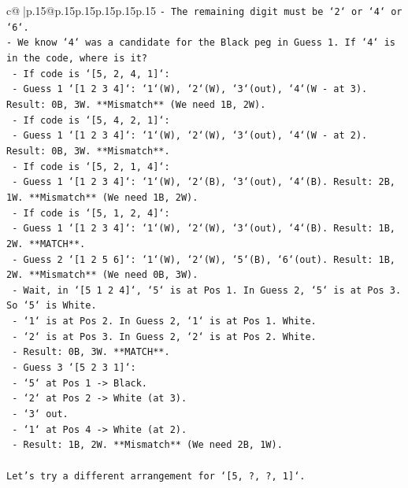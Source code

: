 \documentclass{article}
\begin{document}
{\begin{supertabular}{c@{$\;$}|p{.15\linewidth}@{}p{.15\linewidth}p{.15\linewidth}p{.15\linewidth}p{.15\linewidth}p{.15\linewidth}}
{{{\texttt{{-} The remaining digit must be `2` or `4` or `6`.} \\
\texttt{{-} We know `4` was a candidate for the Black peg in Guess 1. If `4` is in the code, where is it?} \\
\texttt{    {-} If code is `{[}5, 2, 4, 1{]}`:} \\
\texttt{        {-} Guess 1 `{[}1 2 3 4{]}`: `1`(W), `2`(W), `3`(out), `4`(W {-} at 3). Result: 0B, 3W. **Mismatch** (We need 1B, 2W).} \\
\texttt{    {-} If code is `{[}5, 4, 2, 1{]}`:} \\
\texttt{        {-} Guess 1 `{[}1 2 3 4{]}`: `1`(W), `2`(W), `3`(out), `4`(W {-} at 2). Result: 0B, 3W. **Mismatch**.} \\
\texttt{    {-} If code is `{[}5, 2, 1, 4{]}`:} \\
\texttt{        {-} Guess 1 `{[}1 2 3 4{]}`: `1`(W), `2`(B), `3`(out), `4`(B). Result: 2B, 1W. **Mismatch** (We need 1B, 2W).} \\
\texttt{    {-} If code is `{[}5, 1, 2, 4{]}`:} \\
\texttt{        {-} Guess 1 `{[}1 2 3 4{]}`: `1`(W), `2`(W), `3`(out), `4`(B). Result: 1B, 2W. **MATCH**.} \\
\texttt{        {-} Guess 2 `{[}1 2 5 6{]}`: `1`(W), `2`(W), `5`(B), `6`(out). Result: 1B, 2W. **Mismatch** (We need 0B, 3W).} \\
\texttt{        {-} Wait, in `{[}5 1 2 4{]}`, `5` is at Pos 1. In Guess 2, `5` is at Pos 3. So `5` is White.} \\
\texttt{        {-} `1` is at Pos 2. In Guess 2, `1` is at Pos 1. White.} \\
\texttt{        {-} `2` is at Pos 3. In Guess 2, `2` is at Pos 2. White.} \\
\texttt{        {-} Result: 0B, 3W. **MATCH**.} \\
\texttt{        {-} Guess 3 `{[}5 2 3 1{]}`:} \\
\texttt{            {-} `5` at Pos 1 {-}> Black.} \\
\texttt{            {-} `2` at Pos 2 {-}> White (at 3).} \\
\texttt{            {-} `3` out.} \\
\texttt{            {-} `1` at Pos 4 {-}> White (at 2).} \\
\texttt{            {-} Result: 1B, 2W. **Mismatch** (We need 2B, 1W).} \\
\\ 
\texttt{Let's try a different arrangement for `{[}5, ?, ?, 1{]}`.} \\
}}}
\end{supertabular}}
\end{document}
